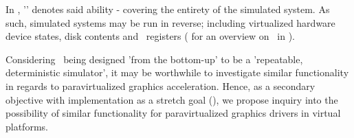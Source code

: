 In \termsimics , '\termrevexe ' denotes said ability - covering the entirety of the simulated system.
As such, simulated systems may be run in reverse; including virtualized hardware device states, disk contents and \termcpu\ registers ( for an overview on \termrevexe\ in \termsimics ).

Considering \termsimics\ being designed 'from the bottom-up' to be a 'repeatable, deterministic simulator', it may be worthwhile to investigate similar functionality in regards to paravirtualized graphics acceleration.
Hence, as a secondary objective with implementation as a stretch goal (), we propose inquiry into the possibility of similar functionality for paravirtualized graphics drivers in virtual platforms.
